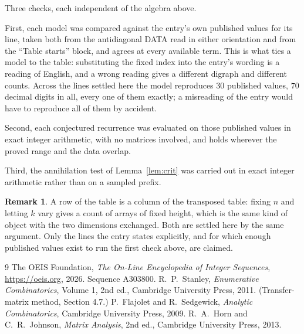 \documentclass[11pt,a4paper]{article}
\theoremstyle{plain}
\theoremstyle{definition}
\newtheorem{remark}[theorem]{Remark}
\begin{document}
Three checks, each independent of the algebra above.

First, each model was compared against the entry's own published values for its line, taken
both from the antidiagonal DATA read in either orientation and from the ``Table starts''
block, and agrees at every available term. This is what ties a model to the table:
substituting the fixed index into the entry's wording is a reading of English, and a wrong
reading gives a different digraph and different counts. Across the lines settled here the
model reproduces $30$ published values, $70$ decimal digits in all, every one of
them exactly; a misreading of the entry would have to reproduce all of them by accident.

Second, each conjectured recurrence was evaluated on those published values in exact
integer arithmetic, with no matrices involved, and holds wherever the proved range and the
data overlap.

Third, the annihilation test of Lemma~\ref{lem:crit} was carried out in exact integer
arithmetic rather than on a sampled prefix.

\begin{remark}
A row of the table is a column of the transposed table: fixing $n$ and letting $k$ vary gives a
count of arrays of fixed height, which is the same kind of object with the two dimensions
exchanged. Both are settled here by the same argument. Only the lines the entry states
explicitly, and for which enough published values exist to run the first check above, are
claimed.
\end{remark}

\begin{thebibliography}{9}
 The OEIS Foundation, \emph{The On-Line Encyclopedia of Integer
Sequences}, \url{https://oeis.org}, 2026. Sequence A303800.
 R.~P.~Stanley, \emph{Enumerative Combinatorics}, Volume 1, 2nd ed.,
Cambridge University Press, 2011. (Transfer-matrix method, Section 4.7.)
 P.~Flajolet and R.~Sedgewick, \emph{Analytic Combinatorics}, Cambridge
University Press, 2009.
 R.~A.~Horn and C.~R.~Johnson, \emph{Matrix Analysis}, 2nd ed., Cambridge
University Press, 2013.
\end{thebibliography}
\end{document}

